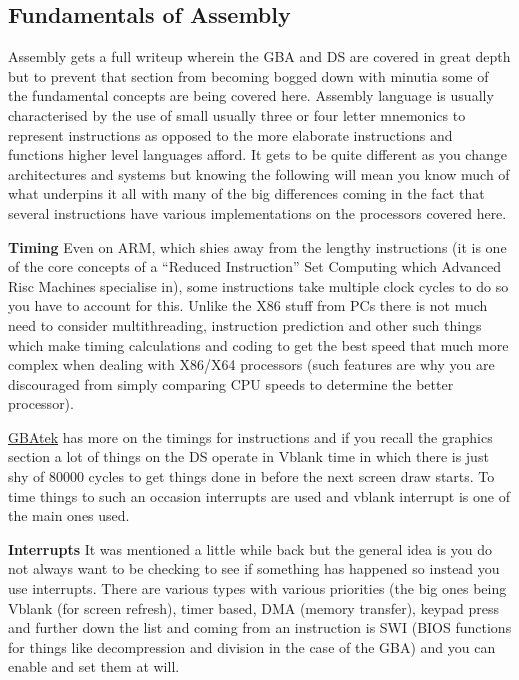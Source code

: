 \documentclass[
]{book}
\begin{document}
\hypertarget{fundamentals-of-assembly}{%
\subsection{Fundamentals of Assembly}\label{fundamentals-of-assembly}}

Assembly gets a full writeup wherein the GBA and DS are covered in great depth but to prevent that section from becoming bogged down with minutia some of the fundamental concepts are being covered here. Assembly language is usually characterised by the use of small usually three or four letter mnemonics to represent instructions as opposed to the more elaborate instructions and functions higher level languages afford. It gets to be quite different as you change architectures and systems but knowing the following will mean you know much of what underpins it all with many of the big differences coming in the fact that several instructions have various implementations on the processors covered here.

\textbf{Timing} Even on ARM, which shies away from the lengthy instructions (it is one of the core concepts of a ``Reduced Instruction'' Set Computing which Advanced Risc Machines specialise in), some instructions take multiple clock cycles to do so you have to account for this. Unlike the X86 stuff from PCs there is not much need to consider multithreading, instruction prediction and other such things which make timing calculations and coding to get the best speed that much more complex when dealing with X86/X64 processors (such features are why you are discouraged from simply comparing CPU speeds to determine the better processor).

\href{http://problemkaputt.de/gbatek.htm\#cpuinstructioncycletimes}{GBAtek} has more on the timings for instructions and if you recall the graphics section a lot of things on the DS operate in Vblank time in which there is just shy of 80000 cycles to get things done in before the next screen draw starts. To time things to such an occasion interrupts are used and vblank interrupt is one of the main ones used.

\textbf{Interrupts} It was mentioned a little while back but the general idea is you do not always want to be checking to see if something has happened so instead you use interrupts. There are various types with various priorities (the big ones being Vblank (for screen refresh), timer based, DMA (memory transfer), keypad press and further down the list and coming from an instruction is SWI (BIOS functions for things like decompression and division in the case of the GBA) and you can enable and set them at will.
\end{document}
